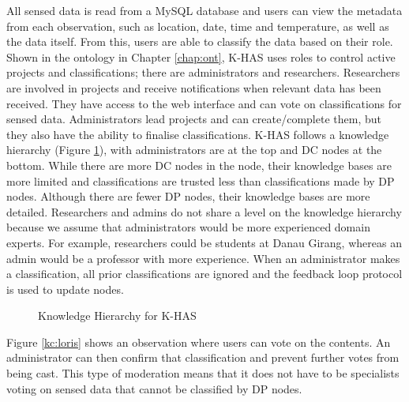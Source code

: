 		All sensed data is read from a MySQL database and users can view the metadata from each observation, such as location, date, time and temperature, as well as the data itself. From this, users are able to classify the data based on their role. Shown in the ontology in Chapter \ref{chap:ont}, K-HAS uses roles to control active projects and classifications; there are administrators and researchers. Researchers are involved in projects and receive notifications when relevant data has been received. They have access to the web interface and can vote on classifications for sensed data. Administrators lead projects and can create/complete them, but they also have the ability to finalise classifications. K-HAS follows a knowledge hierarchy (Figure \ref{arch:kno:hier}), with administrators are at the top and DC nodes at the bottom. While there are more DC nodes in the node, their knowledge bases are more limited and classifications are trusted less than classifications made by DP nodes. Although there are fewer DP nodes, their knowledge bases are more detailed. Researchers and admins do not share a level on the knowledge hierarchy because we assume that administrators would be more experienced domain experts. For example, researchers could be students at Danau Girang, whereas an admin would be a professor with more experience. When an administrator makes a classification, all prior classifications are ignored and the feedback loop protocol is used to update nodes.

		\begin{figure}[!h]
			\centering
			\caption{Knowledge Hierarchy for K-HAS}
			\label{arch:kno:hier}
		\end{figure}
		
		Figure \ref{kc:loris} shows an observation where users can vote on the contents. An administrator can then confirm that classification and prevent further votes from being cast. This type of moderation means that it does not have to be specialists voting on sensed data that cannot be classified by DP nodes.
		
